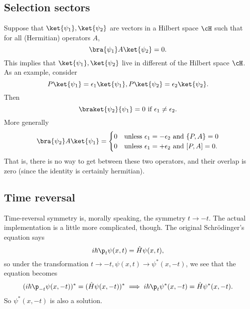 \subsection*{Selection sectors}
Suppose that $\ket{\psi_1},\ket{\psi_2}$ are vectors in a Hilbert space $\cH$ such that for all (Hermitian) operators $A$,
\begin{equation}
    \bra{\psi_1} A \ket{\psi_2} =0.
\end{equation}
This implies that $\ket{\psi_1}, \ket{\psi_2}$ live in different  of the Hilbert space $\cH$.
As an example, consider
\begin{equation}
    P\ket{\psi_1} = \epsilon_1 \ket{\psi_1}, P\ket{\psi_2} = \epsilon_2 \ket{\psi_2}.
\end{equation}
Then
\begin{equation}
    \braket{\psi_2}{\psi_1} = 0 \text{ if } \epsilon_1 \neq \epsilon_2.
\end{equation}
More generally
\begin{equation}
    \bra{\psi_2} A \ket{\psi_1} = \begin{cases}
        0 &\text{unless } \epsilon_1 = -\epsilon_2 \text{ and } \set{P,A}=0\\
        0 &\text{unless } \epsilon_1 = +\epsilon_2\text{ and } [P,A]=0.
    \end{cases}
\end{equation}
That is, there is no way to get between these two operators, and their overlap is zero (since the identity is certainly hermitian).

\subsection*{Time reversal}
Time-reversal symmetry is, morally speaking, the symmetry $t\to -t$. The actual implementation is a little more complicated, though. The original Schr\"odinger's equation says
\begin{equation}
    i\hbar \p_t \psi(x,t) = \hat H \psi(x,t),
\end{equation}
so under the transformation $t\to -t, \psi(x,t) \to \psi^*(x,-t)$, we see that the equation becomes
\begin{equation}
    (i\hbar \p_{-t} \psi(x,-t))^* = (\hat H \psi(x,-t))^* \implies i\hbar \p_t \psi^*(x,-t) = \hat H \psi^*(x,-t).
\end{equation}
So $\psi^*(x,-t)$ is also a solution.

